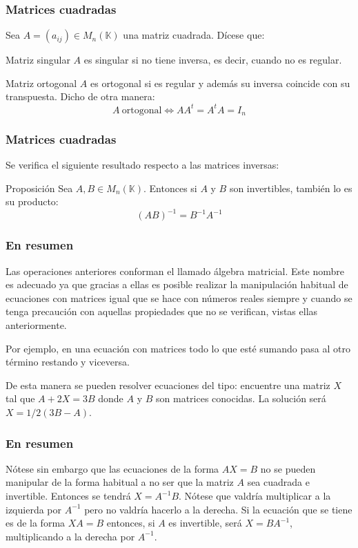 \documentclass[aspectratio=169]{beamer}
\begin{document}
 

 \begin{frame}
  \frametitle{Matrices cuadradas}
Sea $A=(a_{ij})\in M_n(\mathbb{K})$ una matriz cuadrada. D\'icese que:
 
  \begin{block}{Matriz singular}
$A$ es singular si no tiene inversa, es decir, cuando no es regular.
\end{block}


  \begin{block}{Matriz ortogonal}
$A$ es ortogonal si es regular y adem\'as su inversa coincide con su transpuesta. Dicho de otra manera:
\[A \ \mathrm{ortogonal} \Longleftrightarrow AA^t = A^tA= I_n \]

\end{block}
 \end{frame} 



 \begin{frame}
  \frametitle{Matrices cuadradas}
Se verifica el siguiente resultado respecto a las matrices inversas:
  
  \begin{block}{Proposici\'on}
Sea $A,B\in M_n(\mathbb{K})$. Entonces si $A$ y $B$ son invertibles, tambi\'en lo es su producto: 
\[(AB)^{-1} = B^{-1}A^{-1}\]
\end{block}

 \end{frame} 
 
 \begin{frame}
  \frametitle{En resumen}
  
  Las operaciones anteriores conforman el llamado \'algebra matricial. Este nombre es adecuado ya que gracias a ellas es posible realizar la manipulaci\'on habitual de ecuaciones con matrices igual que se hace con n\'umeros reales siempre y cuando se tenga precauci\'on con aquellas propiedades que no se verifican, vistas ellas anteriormente.
  
  Por ejemplo, en una ecuaci\'on con matrices todo lo que est\'e sumando pasa al otro t\'ermino restando y viceversa. 
  
  De esta manera se pueden resolver ecuaciones del tipo: encuentre una matriz $X$ tal que $A+2X =3B$ donde $A$ y $B$ son matrices conocidas. La soluci\'on ser\'a $X=1/2(3B-A)$.
  \end{frame}
  
   \begin{frame}
  \frametitle{En resumen}
   N\'otese sin embargo que las ecuaciones de la forma $AX=B$ no se pueden manipular de la forma habitual a no ser que la matriz $A$ sea cuadrada e invertible. Entonces se tendr\'a $X=A^{-1}B$. N\'otese que valdr\'ia multiplicar a la izquierda por $A^{-1}$ pero no valdr\'ia hacerlo a la derecha. Si la ecuaci\'on que se tiene es de la forma $XA=B$ entonces, si $A$ es invertible, ser\'a $X=BA^{-1}$, multiplicando a la derecha por $A^{-1}$.
\end{frame}
\end{document}
